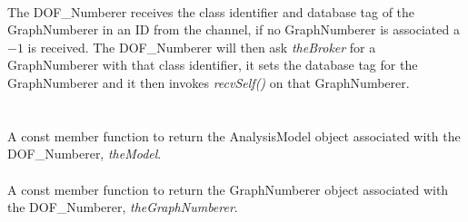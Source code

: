 \\
The DOF\_Numberer receives the class identifier and database tag of
the GraphNumberer in an ID from the channel, if no GraphNumberer is
associated a $-1$ is received. The DOF\_Numberer will then ask {\em
theBroker} for a GraphNumberer with that class identifier, it sets the
database tag for the GraphNumberer and it then invokes {\em
recvSelf()} on that GraphNumberer. \\  

  \\
 \\
A const member function to return the AnalysisModel object associated with
the DOF\_Numberer, {\em theModel}. \\

 \\
A const member function to return the GraphNumberer object associated with
the DOF\_Numberer, {\em theGraphNumberer}. \\







